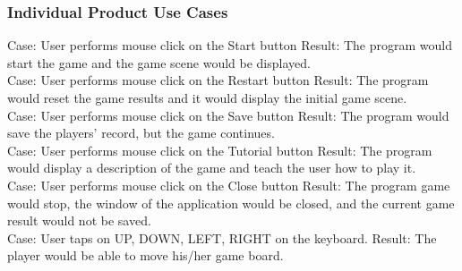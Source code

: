 \documentclass[12pt,letterpaper]{article}
\begin{document}
\subsubsection{Individual Product Use Cases}
	Case: User performs mouse click on the Start button
Result: The program would start the game and the game scene would be displayed.\\
Case: User performs mouse click on the Restart button
Result: The program would reset the game results and it would display the initial game scene.\\
Case: User performs mouse click on the Save button
Result:  The program would save the players’ record, but the game continues. \\
Case: User performs mouse click on the Tutorial button
Result: The program would display a description of the game and teach the user how to play it.\\
Case: User performs mouse click on the Close button
Result: The program game would stop, the window of the application would be closed, and the current game result would not be saved.\\
Case: User taps on UP, DOWN, LEFT, RIGHT on the keyboard.
Result: The player would be able to move his/her game board.\\
\end{document}
